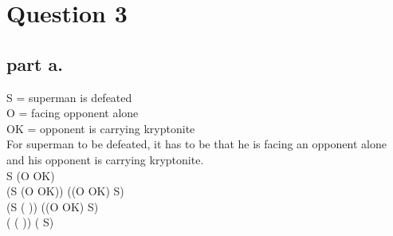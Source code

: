 \section{Question 3}



\subsection{part a.}
S = superman is defeated \\
O = facing opponent alone \\
OK = opponent is carrying kryptonite \\
For superman to be defeated, it has to be that he is facing an opponent alone and his opponent is carrying kryptonite. \\
S \iff (O \land OK)  \\
(S \to (O \land OK)) \land ((O \land OK) \to S)                             \\
(S \to ( \lor {})) \land ((O \land OK) \to S)                                          \\
( \lor ( \lor {})) \land ( \lor S)      \\
